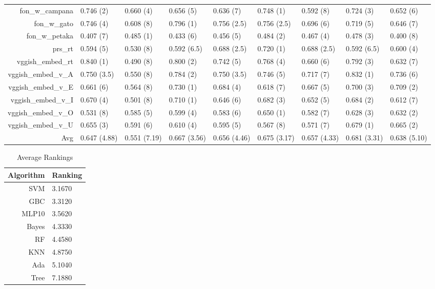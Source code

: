 \documentclass[a4paper,10pt]{article}
\begin{document}
\begin{table}[!htp]
{\begin{tabular}{rllllllll}
fon\_w\_campana&0.746 (2)&0.660 (4)&0.656 (5)&0.636 (7)&0.748 (1)&0.592 (8)&0.724 (3)&0.652 (6)\\
fon\_w\_gato&0.746 (4)&0.608 (8)&0.796 (1)&0.756 (2.5)&0.756 (2.5)&0.696 (6)&0.719 (5)&0.646 (7)\\
fon\_w\_petaka&0.407 (7)&0.485 (1)&0.433 (6)&0.456 (5)&0.484 (2)&0.467 (4)&0.478 (3)&0.400 (8)\\
prs\_rt&0.594 (5)&0.530 (8)&0.592 (6.5)&0.688 (2.5)&0.720 (1)&0.688 (2.5)&0.592 (6.5)&0.600 (4)\\
vggish\_embed\_rt&0.840 (1)&0.490 (8)&0.800 (2)&0.742 (5)&0.768 (4)&0.660 (6)&0.792 (3)&0.632 (7)\\
vggish\_embed\_v\_A&0.750 (3.5)&0.550 (8)&0.784 (2)&0.750 (3.5)&0.746 (5)&0.717 (7)&0.832 (1)&0.736 (6)\\
vggish\_embed\_v\_E&0.661 (6)&0.564 (8)&0.730 (1)&0.684 (4)&0.618 (7)&0.667 (5)&0.700 (3)&0.709 (2)\\
vggish\_embed\_v\_I&0.670 (4)&0.501 (8)&0.710 (1)&0.646 (6)&0.682 (3)&0.652 (5)&0.684 (2)&0.612 (7)\\
vggish\_embed\_v\_O&0.531 (8)&0.585 (5)&0.599 (4)&0.583 (6)&0.650 (1)&0.582 (7)&0.628 (3)&0.632 (2)\\
vggish\_embed\_v\_U&0.655 (3)&0.591 (6)&0.610 (4)&0.595 (5)&0.567 (8)&0.571 (7)&0.679 (1)&0.665 (2)\\
\Xhline{2\arrayrulewidth}
Avg&0.647 (4.88)&0.551 (7.19)&0.667 (3.56)&0.656 (4.46)&0.675 (3.17)&0.657 (4.33)&0.681 (3.31)&0.638 (5.10)\\
\end{tabular}}
\end{table}




\begin{table}[!htp]
\centering
\caption{Average Rankings}
\begin{tabular}{r|l}
Algorithm&Ranking\\
\hline
 SVM & 3.1670 \\
 GBC & 3.3120 \\
 MLP10 & 3.5620 \\
 Bayes & 4.3330 \\
 RF & 4.4580 \\
 KNN & 4.8750 \\
 Ada & 5.1040 \\
 Tree & 7.1880 \\
\end{tabular}
\end{table}
\end{document}
